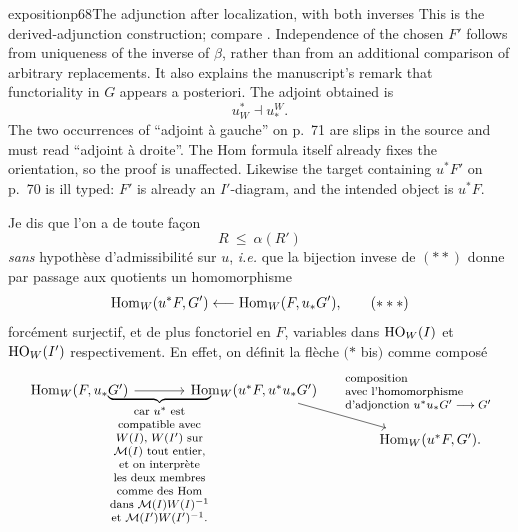 \begin{dcomment}{exposition}{p68}{The adjunction after localization, with both inverses}
This is the derived-adjunction construction; compare \citet[Lemma 1.3.10]{Hovey1999}. Independence of the chosen $F'$ follows from uniqueness of the inverse of $\beta$, rather than from an additional comparison of arbitrary replacements. It also explains the manuscript's remark that functoriality in $G$ appears a posteriori. The adjoint obtained is
\[
                                u_W^*\dashv u_*^W.
\]
The two occurrences of ``adjoint \`a gauche'' on p.~71 are slips in the source and must read ``adjoint \`a droite''. The Hom formula itself already fixes the orientation, so the proof is unaffected. Likewise the target containing $u^*F'$ on p.~70 is ill typed: $F'$ is already an $I'$-diagram, and the intended object is $u^*F$.
\end{dcomment}


Je dis que l'on a de toute façon
\[
R \ \leq \ \alpha(R')
\]
\textit{sans} hypothèse d'admissibilité sur $u$, \textit{i.e.} que la bijection invese de $(**)$ donne par passage aux quotients un homomorphisme %
\[
\Hom_W(u^*F, G') \longleftarrow \Hom_W(F, u_*G'), \tag*{$(***)$}
\]
forcément surjectif, et de plus fonctoriel en $F$, variables dans $\mathrm{HO}_W(I)$ et $\mathrm{HO}_W(I')$ respectivement. En effet, on définit la flèche $(*$ bis$)$ comme composé
\[
\begin{tikzcd}[column sep=large]
\Hom_W(F, u_*G') \arrow[r, "\underbrace{\hspace{2.6cm}}_{\text{\footnotesize\begin{tabular}{@{}c@{}}car $u^*$ est\\ compatible avec\\ $W(I)$, $W(I')$ sur\\ $\cM(I)$ tout entier,\\ et on interprète\\ les deux membres\\ comme des Hom\\ dans $\cM(I)W(I)^{-1}$\\ et $\cM(I')W(I')^{-1}$.\end{tabular}}}"'] & \Hom_W(u^*F, u^*u_*G') \arrow[dr, "\text{\footnotesize\begin{tabular}{@{}l@{}}composition\\ avec l'homomorphisme\\ d'adjonction $u^*u_*G' \longrightarrow G'$\end{tabular}}"] & \\
 & & \Hom_W(u^*F, G').
\end{tikzcd}
\]

